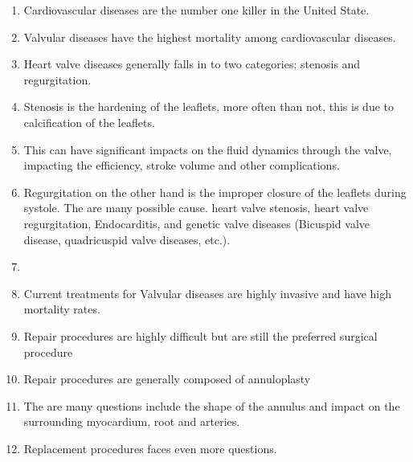 \begin{enumerate}
\item Cardiovascular diseases are the number one killer in the United State. 
\item Valvular diseases have the highest mortality among cardiovascular diseases. 
\item Heart valve diseases generally falls in to two categories: stenosis and regurgitation. 
\item Stenosis is the hardening of the leaflets, more often than not, this is due to calcification of the leaflets. 
\item This can have significant impacts on the fluid dynamics through the valve, impacting the efficiency, stroke volume and other complications. 
\item Regurgitation on the other hand is the improper closure of the leaflets during systole. The are many possible cause. heart valve stenosis, heart valve regurgitation, Endocarditis, and genetic valve diseases (Bicuspid valve disease, quadricuspid valve diseases, etc.). 
\item 
\item Current treatments for Valvular diseases are highly invasive and have high mortality rates. 
\item Repair procedures are highly difficult but are still the preferred surgical procedure
\item Repair procedures are generally composed of annuloplasty 
\item The are many questions include the shape of the annulus and impact on the surrounding myocardium, root and arteries. 
\item Replacement procedures faces even more questions.




\end{enumerate}